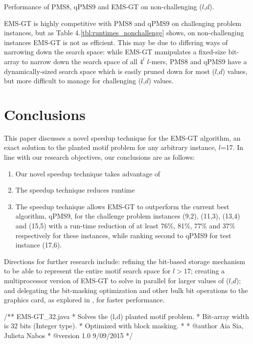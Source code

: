 \documentclass[oneside,12pt]{DISCSthesis}
\begin{document}
{\begin{table}[ht]
			\caption{\small Performance of PMS8, qPMS9 and EMS-GT on non-challenging ($l$,$d$).}
			\end{table}

		EMS-GT is highly competitive with PMS8 and qPMS9 on challenging problem instances, but as Table 4.\ref{tbl:runtimes_nonchallenge} shows, on non-challenging instances EMS-GT is not as efficient. This may be due to differing ways of narrowing down the search space: while EMS-GT manipulates a fixed-size bit-array to narrow down the search space of all $4^l$ $l$-mers, PMS8 and qPMS9 have a dynamically-sized search space which is easily pruned down for most ($l$,$d$) values, but more difficult to manage for challenging ($l$,$d$) values.

\chapter{Conclusions}
	This paper discusses a novel speedup technique for the EMS-GT algorithm, an exact solution to the planted motif problem for any arbitrary instance, $l$=17. In line with our research objectives, our conclusions are as follows:
	\begin{enumerate}
	\item Our novel speedup technique takes advantage of 
	\item The speedup technique reduces runtime 
	\item The speedup technique allows EMS-GT to outperform the current best algorithm, qPMS9, for the challenge problem instances (9,2), (11,3), (13,4) and (15,5) with a run-time reduction of at least 76\%, 81\%, 77\% and 37\% respectively for these instances, while ranking second to qPMS9 for test instance (17,6).
	\end{enumerate}

	\noindent Directions for further research include: refining the bit-based storage mechanism to be able to represent the entire motif search space for $l > 17$; creating a multiprocessor version of EMS-GT to solve in parallel for larger values of ($l$,$d$); and delegating the bit-masking optimization and other bulk bit operations to the graphics card, as explored in \cite{dasari2010efficient}, for faster performance.

\BackMatter



%


\begin{footnotesize}
\begin{verbatimtab}[2]
/** EMS-GT_32.java
  * Solves the (l,d) planted motif problem.
  * Bit-array width is 32 bits (Integer type).
  * Optimized with block masking.
  *
  * @author Aia Sia, Julieta Nabos
  * @version 1.0 9/09/2015
  */


\end{verbatimtab}
\end{footnotesize}}
\end{document}
